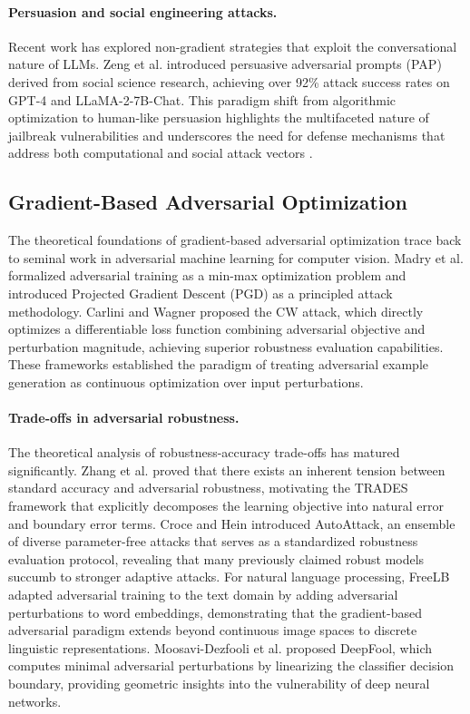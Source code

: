 \documentclass[preprint,12pt]{elsarticle}
\begin{document}
\paragraph{Persuasion and social engineering attacks.} Recent work has explored non-gradient strategies that exploit the conversational nature of LLMs. Zeng et al. \cite{zeng2024persuasion} introduced persuasive adversarial prompts (PAP) derived from social science research, achieving over 92\% attack success rates on GPT-4 and LLaMA-2-7B-Chat. This paradigm shift from algorithmic optimization to human-like persuasion highlights the multifaceted nature of jailbreak vulnerabilities and underscores the need for defense mechanisms that address both computational and social attack vectors \cite{yang2023ai_safety_txxb}.

\subsection{Gradient-Based Adversarial Optimization}
\label{sec:rw_gradient}

The theoretical foundations of gradient-based adversarial optimization trace back to seminal work in adversarial machine learning for computer vision. Madry et al. \cite{madry2018towards} formalized adversarial training as a min-max optimization problem and introduced Projected Gradient Descent (PGD) as a principled attack methodology. Carlini and Wagner \cite{carlini2017towards} proposed the CW attack, which directly optimizes a differentiable loss function combining adversarial objective and perturbation magnitude, achieving superior robustness evaluation capabilities. These frameworks established the paradigm of treating adversarial example generation as continuous optimization over input perturbations.

\paragraph{Trade-offs in adversarial robustness.} The theoretical analysis of robustness-accuracy trade-offs has matured significantly. Zhang et al. \cite{zhang2019theoretically} proved that there exists an inherent tension between standard accuracy and adversarial robustness, motivating the TRADES framework that explicitly decomposes the learning objective into natural error and boundary error terms. Croce and Hein \cite{croce2020reliable} introduced AutoAttack, an ensemble of diverse parameter-free attacks that serves as a standardized robustness evaluation protocol, revealing that many previously claimed robust models succumb to stronger adaptive attacks. For natural language processing, FreeLB \cite{zhu2020freelb} adapted adversarial training to the text domain by adding adversarial perturbations to word embeddings, demonstrating that the gradient-based adversarial paradigm extends beyond continuous image spaces to discrete linguistic representations. Moosavi-Dezfooli et al. \cite{moosavi2016deepfool} proposed DeepFool, which computes minimal adversarial perturbations by linearizing the classifier decision boundary, providing geometric insights into the vulnerability of deep neural networks.
\end{document}
